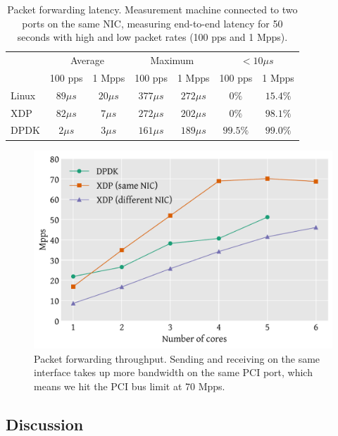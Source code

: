 \documentclass[sigconf]{acmart}
\begin{document}
\begin{table}[tbp]
  \caption{\label{tbl:fwd-latency}Packet forwarding latency. Measurement machine
    connected to two ports on the same NIC, measuring end-to-end latency for 50
    seconds with high and low packet rates (100 pps and 1 Mpps).}
\centering
\begin{tabular}{lcccccc}
  \toprule
   & \multicolumn{2}{c}{Average}  &  \multicolumn{2}{c}{Maximum} &  \multicolumn{2}{c}{$< 10 \mu s$}  \\
   & 100 pps & 1 Mpps  &  100 pps & 1 Mpps & 100 pps & 1 Mpps \\
  \midrule
  Linux & $89 \mu s$ & $20 \mu s$ & $377 \mu s$ & $272 \mu s$ & $ 0 \%$ & $15.4 \%$  \\
  XDP & $82 \mu s$ & $7 \mu s$ & $272 \mu s$ & $202 \mu s$ & $0 \%$ & $98.1 \%$  \\
  DPDK & $2 \mu s$ &  $3 \mu s$ & $161 \mu s$ & $189 \mu s$ & $99.5 \%$ & $99.0 \%$  \\
\bottomrule
\end{tabular}
\end{table}

\begin{figure}[t]
\centering
\includegraphics[width=\linewidth]{figures/redirect-test.pdf}
\caption{\label{fig:redirect-test} Packet forwarding throughput. Sending and
  receiving on the same interface takes up more bandwidth on the same PCI port,
  which means we hit the PCI bus limit at 70 Mpps.}
\end{figure}

\subsection{Discussion}
\label{sec:perf-discussion}
\end{document}
